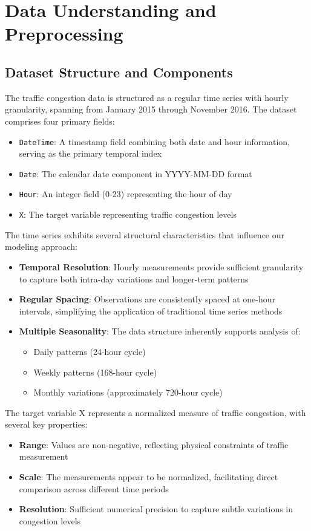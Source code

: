 \documentclass{article}
\begin{document}
\section{Data Understanding and Preprocessing}

\subsection{Dataset Structure and Components}
The traffic congestion data is structured as a regular time series with hourly granularity, spanning from January 2015 through November 2016. The dataset comprises four primary fields:

\begin{itemize}
\item \texttt{DateTime}: A timestamp field combining both date and hour information, serving as the primary temporal index
\item \texttt{Date}: The calendar date component in YYYY-MM-DD format
\item \texttt{Hour}: An integer field (0-23) representing the hour of day
\item \texttt{X}: The target variable representing traffic congestion levels
\end{itemize}

The time series exhibits several structural characteristics that influence our modeling approach:

\begin{itemize}
\item \textbf{Temporal Resolution}: Hourly measurements provide sufficient granularity to capture both intra-day variations and longer-term patterns
\item \textbf{Regular Spacing}: Observations are consistently spaced at one-hour intervals, simplifying the application of traditional time series methods
\item \textbf{Multiple Seasonality}: The data structure inherently supports analysis of:
  \begin{itemize}
  \item Daily patterns (24-hour cycle)
  \item Weekly patterns (168-hour cycle)
  \item Monthly variations (approximately 720-hour cycle)
  \end{itemize}
\end{itemize}

The target variable X represents a normalized measure of traffic congestion, with several key properties:
\begin{itemize}
\item \textbf{Range}: Values are non-negative, reflecting physical constraints of traffic measurement
\item \textbf{Scale}: The measurements appear to be normalized, facilitating direct comparison across different time periods
\item \textbf{Resolution}: Sufficient numerical precision to capture subtle variations in congestion levels
\end{itemize}
\end{document}
